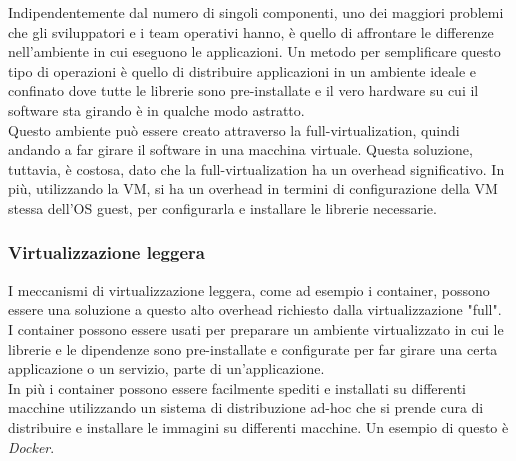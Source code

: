 \documentclass{article}
\begin{document}
Indipendentemente dal numero di singoli componenti, uno dei maggiori problemi che gli sviluppatori e i team operativi hanno, è quello di affrontare le differenze nell'ambiente in cui eseguono le applicazioni. Un metodo per semplificare questo tipo di operazioni è quello di distribuire applicazioni in un ambiente ideale e confinato dove tutte le librerie sono pre-installate e il vero hardware su cui il software sta girando è in qualche modo astratto. \\ 
Questo ambiente può essere creato attraverso la full-virtualization, quindi andando a far girare il software in una macchina virtuale. Questa soluzione, tuttavia, è costosa, dato che la full-virtualization ha un overhead significativo. In più, utilizzando la VM, si ha un overhead in termini di configurazione della VM stessa dell'OS guest, per configurarla e installare le librerie necessarie.

\subsubsection{Virtualizzazione leggera}
I meccanismi di virtualizzazione leggera, come ad esempio i container, possono essere una soluzione a questo alto overhead richiesto dalla virtualizzazione "full". \\
I container possono essere usati per preparare un ambiente virtualizzato in cui le librerie e le dipendenze sono pre-installate e configurate per far girare una certa applicazione o un servizio, parte di un'applicazione. \\ 
In più i container possono essere facilmente spediti e installati su differenti macchine utilizzando un sistema di distribuzione ad-hoc che si prende cura di distribuire e installare le immagini su differenti macchine. Un esempio di questo è \textit{Docker}.
\end{document}
